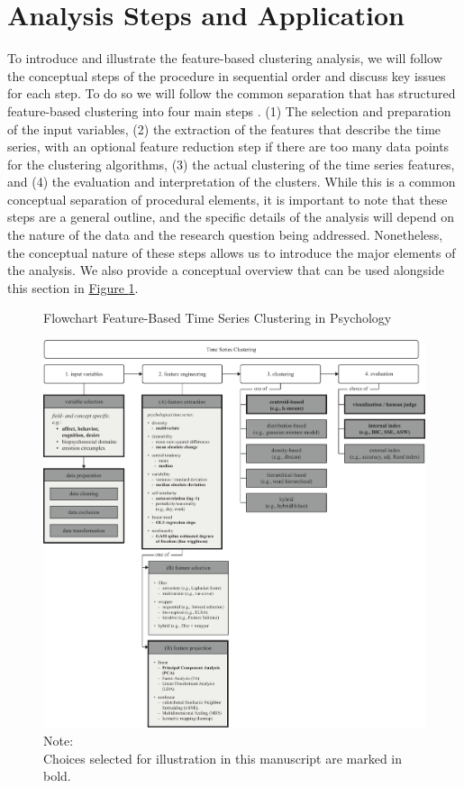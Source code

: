\documentclass[man, 12pt, a4paper, mask, floatsintext]{apa7}
\theoremstyle{break}
\theoremstyle{plain}
\newcommand{\fgrref}[2][]{\hyperref[#2]{Figure \ref*{#2}#1}}
\begin{document}


\section{Analysis Steps and Application} 

To introduce and illustrate the feature-based clustering analysis, we will follow the conceptual steps of the procedure in sequential order and discuss key issues for each step. To do so we will follow the common separation that has structured feature-based clustering into four main steps \citep{rasanen2009, wang2006}. (1) The selection and preparation of the input variables, (2) the extraction of the features that describe the time series, with an optional feature reduction step if there are too many data points for the clustering algorithms, (3) the actual clustering of the time series features, and (4) the evaluation and interpretation of the clusters. 
While this is a common conceptual separation of procedural elements, it is important to note that these steps are a general outline, and the specific details of the analysis will depend on the nature of the data and the research question being addressed. Nonetheless, the conceptual nature of these steps allows us to introduce the major elements of the analysis. We also provide a conceptual overview that can be used alongside this section in \fgrref{fig:TSCFlow}.

\begin{figure}[!ht] %
  \caption{Flowchart Feature-Based Time Series Clustering in Psychology}
  \label{fig:TSCFlow}
  \centering\includegraphics[width=\textwidth]{figures/TS Cluster Flow/TimeSeriesClusterFlowSelection.pdf}
  \caption*{Note: \\
  Choices selected for illustration in this manuscript are marked in bold.}
\end{figure}
\end{document}

